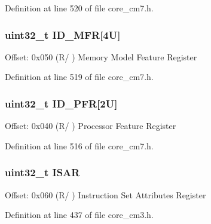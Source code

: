 Definition at line 520 of file core\+\_\+cm7.\+h.

\subsubsection[{\texorpdfstring{I\+D\+\_\+\+M\+FR}{ID_MFR}}]{ uint32\+\_\+t I\+D\+\_\+\+M\+FR\mbox{[}4\+U\mbox{]}}\hypertarget{struct_s_c_b___type_a1df83089e7726e2723e2c4f370814832}{}\label{struct_s_c_b___type_a1df83089e7726e2723e2c4f370814832}
Offset\+: 0x050 (R/ ) Memory Model Feature Register 

Definition at line 519 of file core\+\_\+cm7.\+h.

\subsubsection[{\texorpdfstring{I\+D\+\_\+\+P\+FR}{ID_PFR}}]{ uint32\+\_\+t I\+D\+\_\+\+P\+FR\mbox{[}2\+U\mbox{]}}\hypertarget{struct_s_c_b___type_a37569b15cd2c9a50691e8b5e15a1d129}{}\label{struct_s_c_b___type_a37569b15cd2c9a50691e8b5e15a1d129}
Offset\+: 0x040 (R/ ) Processor Feature Register 

Definition at line 516 of file core\+\_\+cm7.\+h.

\subsubsection[{\texorpdfstring{I\+S\+AR}{ISAR}}]{ uint32\+\_\+t I\+S\+AR}\hypertarget{struct_s_c_b___type_af3bf768338667219b55cc904fa5b87f9}{}\label{struct_s_c_b___type_af3bf768338667219b55cc904fa5b87f9}
Offset\+: 0x060 (R/ ) Instruction Set Attributes Register 

Definition at line 437 of file core\+\_\+cm3.\+h.

